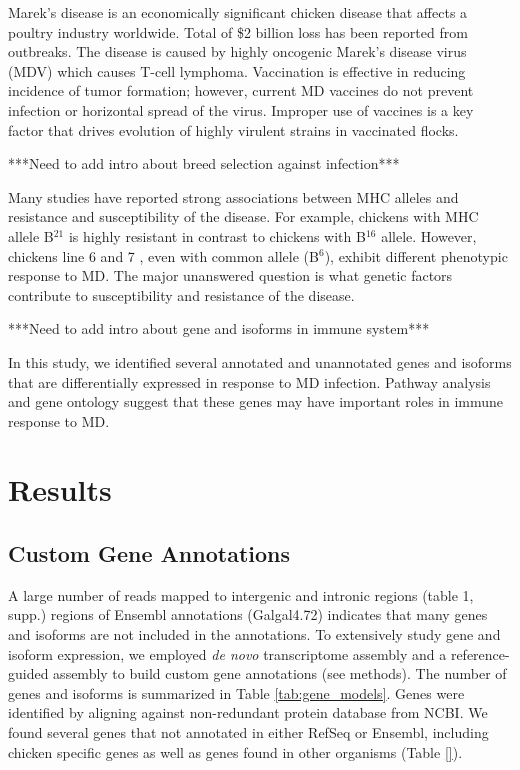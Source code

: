 \documentclass[10pt]{article}
\begin{document}
Marek's disease is an economically significant chicken disease that affects a poultry industry worldwide.
Total of \$2 billion loss has been reported from outbreaks.
The disease is caused by highly oncogenic Marek's disease virus (MDV) which causes T-cell lymphoma.
Vaccination is effective in reducing incidence of tumor formation; however, current MD vaccines do not
prevent infection or horizontal spread of the virus.
Improper use of vaccines is a key factor that drives evolution of highly virulent strains in vaccinated
flocks.

***Need to add intro about breed selection against infection***

Many studies have reported strong associations between MHC alleles and resistance and susceptibility of
the disease. For example, chickens with MHC allele B$^{21}$ is highly resistant in contrast to chickens with
B$^{16}$ allele.
However, chickens line 6 and 7 , even with common allele (B$^6$), exhibit different phenotypic response to
MD.
The major unanswered question is what genetic factors contribute to susceptibility and resistance of
the disease.

***Need to add intro about gene and isoforms in immune system***

In this study, we identified several annotated and unannotated genes and isoforms that are differentially
expressed in response to MD infection. Pathway analysis and gene ontology suggest that these
genes may have important roles in immune response to MD.


\section*{Results}

\subsection*{Custom Gene Annotations}
A large number of reads mapped to intergenic and intronic regions (table 1, supp.)
regions of Ensembl annotations (Galgal4.72)
indicates that many genes and isoforms are not included in the annotations.
To extensively study gene and isoform expression, we employed \emph{de novo}
transcriptome assembly and a reference-guided assembly to build custom gene annotations (see methods).
The number of genes and isoforms is summarized in Table \ref{tab:gene_models}.
Genes were identified by aligning against non-redundant protein database from NCBI.
We found several genes that not annotated in either RefSeq or Ensembl, including chicken specific genes
as well as genes found in other organisms (Table \ref{}).
\end{document}
